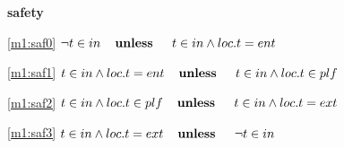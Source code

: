 \textbf{safety}
\begin{block}
\item[ \eqref{m1:saf0} ]{$\neg t \in in  \textbf{\quad unless \quad} t \in in \land loc.t = ent $} %
\item[ \eqref{m1:saf1} ]{$t \in in \land loc.t = ent  \textbf{\quad unless \quad} t \in in \land loc.t \in plf $} %
\item[ \eqref{m1:saf2} ]{$t \in in \land loc.t \in plf  \textbf{\quad unless \quad} t \in in \land loc.t = ext $} %
\item[ \eqref{m1:saf3} ]{$t \in in \land loc.t = ext  \textbf{\quad unless \quad} \neg t \in in $} %
\end{block}
